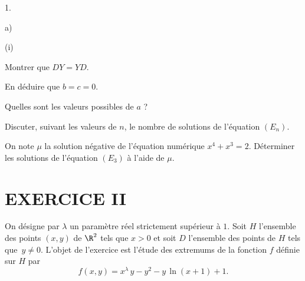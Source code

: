 \documentclass[11pt]{article}%
\begin{document}
\begin{noliste}{1.}
\begin{noliste}{a)}
\begin{nonoliste}{(i)}
\item Montrer que $DY = YD$.

\item En déduire que $b = c = 0$.

\item Quelles sont les valeurs possibles de $a$ ?

\item Discuter, suivant les valeurs de $n$, le nombre de solutions de
l'équation $(E_{n})$.
\end{nonoliste}

\item On note $\mu $ la solution négative de l'équation numérique
$x^{4} + x^{3} = 2$. Déterminer les solutions de l'équation $(E_{3})$ à
l'aide de 
$\mu $.
\end{noliste}
\end{noliste}

\section*{{\textbf{EXERCICE II}}}

On désigne par $\lambda $ un paramètre réel strictement supérieur à
$1$.
Soit $H$ l'ensemble des points $(x,y)$ de $\R^{2}$ tels que $x>0$ et
soit $D$ l'ensemble des points de $H$ tels que $\,y\neq 0$. L'objet de
l'exercice est l'étude des extremums de la fonction $f$ définie sur $H$
par 
\[
f(x,y) = x^{\lambda }\,y-y^{2}-y\,\ln (x + 1) + 1.
\]
\end{document}
